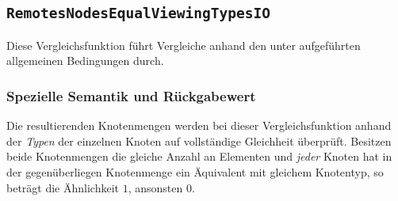 \newpage
%
%
\subsection{\texttt{RemotesNodesEqualViewingTypesIO}}
Diese Vergleichsfunktion führt Vergleiche anhand den unter  aufgeführten allgemeinen Bedingungen durch.

\subsubsection*{Spezielle Semantik und Rückgabewert}
Die resultierenden Knotenmengen werden bei dieser Vergleichsfunktion anhand der \emph{Typen} der einzelnen Knoten auf vollständige Gleichheit überprüft. Besitzen beide Knotenmengen die gleiche Anzahl an Elementen und \emph{jeder} Knoten hat in der gegenüberliegen Knotenmenge ein Äquivalent mit gleichem Knotentyp, so beträgt die Ähnlichkeit $1$, ansonsten $0$.